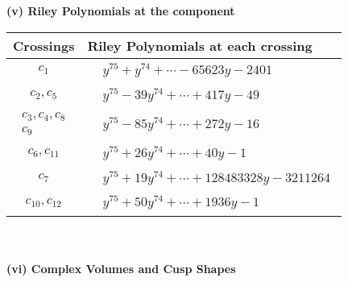 \documentclass[1p]{elsarticle_modified}
\theoremstyle{definition}
\begin{document}
\newpage\renewcommand{\arraystretch}{1}
\flushleft \textbf{(v) Riley Polynomials at the component}\newline \\
\begin{tabular}{m{50pt}|m{274pt}}
Crossings & \hspace{64pt}Riley Polynomials at each crossing \\
\hline $$\begin{aligned}c_{1}\end{aligned}$$&$\begin{aligned}
&y^{75}+y^{74}+\cdots-65623 y-2401
\end{aligned}$\\
\hline $$\begin{aligned}c_{2},c_{5}\end{aligned}$$&$\begin{aligned}
&y^{75}-39 y^{74}+\cdots+417 y-49
\end{aligned}$\\
\hline $$\begin{aligned}c_{3},c_{4},c_{8}\\c_{9}\end{aligned}$$&$\begin{aligned}
&y^{75}-85 y^{74}+\cdots+272 y-16
\end{aligned}$\\
\hline $$\begin{aligned}c_{6},c_{11}\end{aligned}$$&$\begin{aligned}
&y^{75}+26 y^{74}+\cdots+40 y-1
\end{aligned}$\\
\hline $$\begin{aligned}c_{7}\end{aligned}$$&$\begin{aligned}
&y^{75}+19 y^{74}+\cdots+128483328 y-3211264
\end{aligned}$\\
\hline $$\begin{aligned}c_{10},c_{12}\end{aligned}$$&$\begin{aligned}
&y^{75}+50 y^{74}+\cdots+1936 y-1
\end{aligned}$\\
\hline
\end{tabular}\\~\\
\newpage\flushleft \textbf{(vi) Complex Volumes and Cusp Shapes}
\end{document}
